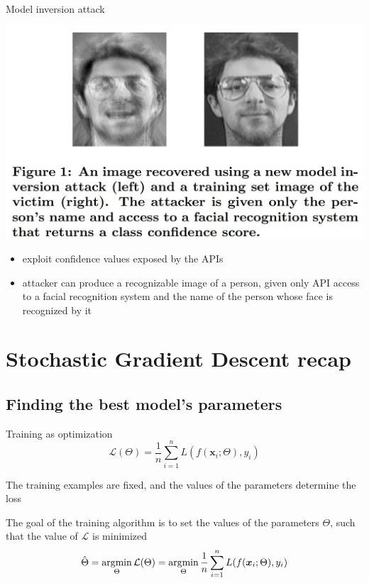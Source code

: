 \documentclass[12pt,aspectratio=169,handout]{beamer}
\begin{document}
\begin{frame}{Model inversion attack \citep{Fredrikson.et.al.2015.SIGSAC}}

\includegraphics[width=0.6\linewidth]{img/fredrikson.et.al.jpg}

\begin{itemize}
\item exploit confidence values exposed by the APIs
\item attacker can produce a recognizable image of a person, given only API access to a facial recognition system and the name of the person whose face is recognized by it
\end{itemize}



\end{frame}


\section{Stochastic Gradient Descent recap}


\subsection{Finding the best model's parameters}


\begin{frame}{Training as optimization}
$$
\mathcal{L}(\Theta) = \frac{1}{n} \sum_{i =1}^{n} L (f(\bm{x}_i; \Theta), y_i)
$$

The training examples are fixed, and the values of the parameters determine the loss

The goal of the training algorithm is to set the values of the parameters $\Theta$‚ such that
the value of $\mathcal{L}$ is minimized
$$
\hat{\Theta} = \operatorname*{arg\!\min}_{\Theta} \mathcal{L}(\Theta) = \operatorname*{arg\!\min}_{\Theta} \frac{1}{n} \sum_{i =1}^{n} L (f(\bm{x}_i; \Theta), y_i)
$$


\end{frame}
\end{document}

